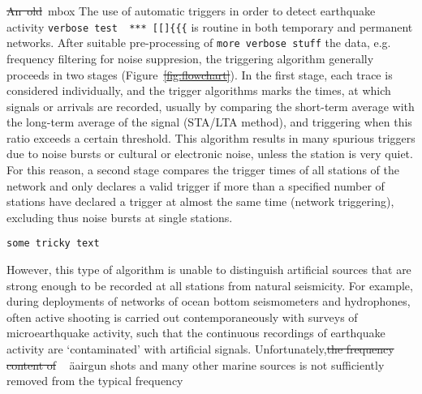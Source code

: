 \documentclass[11pt]{article}
\providecommand{\DIFadd}[1]{{\protect\color{blue}\uwave{#1}}} %
\providecommand{\DIFdel}[1]{{\protect\color{red}\sout{#1}}}                      %
\providecommand{\DIFaddbegin}{} %
\providecommand{\DIFaddend}{} %
\providecommand{\DIFdelbegin}{} %
\providecommand{\DIFdelend}{} %
\begin{document}
\mbox{\DIFdelbegin \DIFdel{An old }\DIFdelend \DIFaddbegin \DIFadd{A new }\DIFaddend mbox}
The use of automatic triggers in order to detect earthquake activity \DIFaddbegin \verb|verbose test  *** [[]{{{|
\DIFaddend is routine in both temporary and permanent networks.   After suitable pre-processing of \DIFaddbegin \verb|more verbose stuff|
\DIFaddend the data, e.g. frequency filtering for noise suppresion, the
triggering algorithm generally proceeds in two stages
(Figure~\DIFdelbegin \DIFdel{\ref{fig:flowchart}}\DIFdelend \DIFaddbegin \DIFadd{\ref{fig:flowchart-2}}\DIFaddend ).  In the first stage, each trace is considered
individually, and the trigger algorithms marks the times, at which
signals or arrivals are recorded, usually by comparing the short-term
average with the long-term average of the signal (STA/LTA method), and
triggering when this ratio exceeds a certain threshold.  This
algorithm results in many spurious triggers due to noise bursts or
cultural or electronic noise, unless the station is very quiet.  For
this reason, a second stage compares the trigger times of all stations
of the network and only declares a valid trigger if more than a
specified number of stations have declared a trigger at almost the
same time (network triggering), excluding thus noise bursts at single stations.  
\DIFdelbegin %
\DIFdelend \DIFaddbegin \begin{verbatim}
some tricky text
\end{verbatim}
\DIFaddend However, this type of algorithm is unable to distinguish artificial
sources that are strong enough to be recorded at all stations from
natural seismicity. For example, during deployments of networks of ocean bottom
seismometers and hydrophones, often active shooting is carried out
contemporaneously with surveys of microearthquake activity, such that
the continuous recordings of earthquake activity are `contaminated' with artificial signals.
Unfortunately,\DIFdelbegin \DIFdel{the frequency content of
}\DIFdelend \DIFaddbegin \ \DIFadd{the }{\em \DIFadd{frequency content}} \DIFadd{of M}\"{a}\DIFadd{rchen
}\DIFaddend airgun shots and many other marine sources is not sufficiently removed from the typical frequency
\end{document}
